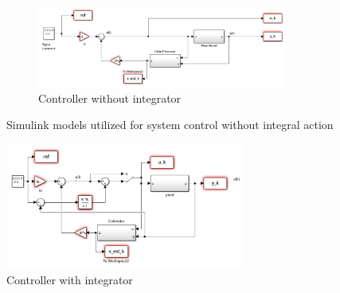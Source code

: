 \begin{figure}[H]
\begin{subfigure}{0.95\textwidth}
        \includegraphics[width=0.9\textwidth]{Figs/Simulink Models/Controller_without_integrator.png}
        \caption{Controller without integrator}
        \label{fig:controller_without_integrator}
    \end{subfigure}
    \caption{Simulink models utilized for system control without integral action}
    \label{fig:simulink_models_no_integrator}
\end{figure}



\begin{figure}[H]
    \centering
    \includegraphics[width=0.7\textwidth]{Figs/Simulink Models/controller_with_integrator.png}
    \caption{Controller with integrator}
    \label{fig:controler_with_integrator}
\end{figure}
